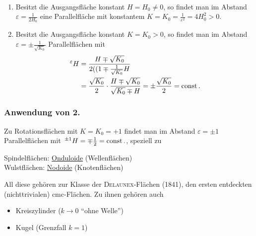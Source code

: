 \begin{folgerung}\(\)
 \begin{enumerate}
  \item Besitzt die Ausgangsfläche konstant \(H = H_0 \ne 0\), so findet man im Abstand \(\varepsilon = \frac{1}{2 H_0}\) eine Parallelfläche mit konstantem \(K = K_0 = \frac{1}{\varepsilon^2} = 4 H_0^2 > 0\).
  \item Besitzt die Ausgangsfläche konstant \(K = K_0 > 0\), so findet man im Abstand \(\varepsilon = \pm \frac{1}{\sqrt{K_0}}\) Parallelflächen mit
  \begin{align*}
   \,^\varepsilon H &= \frac{H \mp \sqrt{K_0}}{2((1 \mp \frac{1}{\sqrt{K_0}} H} \\
   &= \frac{\sqrt{K_0}}{2} \cdot \frac{H \mp \sqrt{K_0}}{\sqrt{K_0} \mp H} = \pm \frac{\sqrt{K_0}} 	{2} = \operatorname{const}.
  \end{align*}
 \end{enumerate}
\end{folgerung}

\subsubsection{Anwendung von 2.}
Zu Rotationsflächen mit \(K = K_0 = + 1\) findet man im Abstand \(\varepsilon = \pm 1\) Parallelflächen mit \(\,^{\pm 1}H = \mp \frac12 = \operatorname{const}.\), speziell zu \par
Spindelflächen: \uline{Onduloide} (Wellenflächen) \\
Wulstflächen: \uline{Nodoide} (Knotenflächen) \par

All diese gehören zur Klasse der \textsc{Delaunex}-Flächen (1841), den ersten entdeckten (nichttrivialen) cmc-Flächen. Zu ihnen gehören auch
\begin{itemize}
 \item Kreiszylinder (\(k \to 0\) "`ohne Welle"')
 \item Kugel (Grenzfall \(k = 1\))
\end{itemize}


